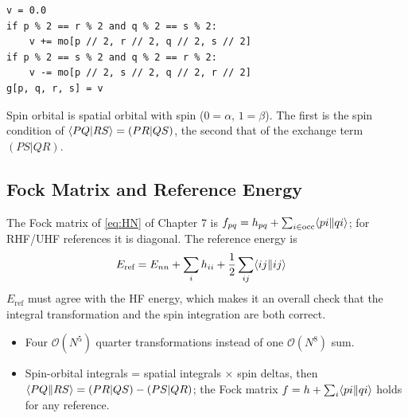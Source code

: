 \begin{codemap}
\begin{lstlisting}[frame=none, numbers=none, xleftmargin=0pt, backgroundcolor={}]
v = 0.0
if p % 2 == r % 2 and q % 2 == s % 2:
    v += mo[p // 2, r // 2, q // 2, s // 2]
if p % 2 == s % 2 and q % 2 == r % 2:
    v -= mo[p // 2, s // 2, q // 2, r // 2]
g[p, q, r, s] = v
\end{lstlisting}
Spin orbital  is spatial orbital  with spin  ($0 = \alpha$, $1 = \beta$). The first  is the spin condition of $\langle PQ\vert RS\rangle = (PR|QS)$, the second that of the exchange term $(PS|QR)$.
\end{codemap}

\subsection{Fock Matrix and Reference Energy}

The Fock matrix of \eqref{eq:HN} of Chapter 7 is $f_{pq} = h_{pq} + \sum_{i \in \text{occ}} \langle pi\Vert qi\rangle$; for RHF/UHF references it is diagonal. The reference energy is
\begin{align*}
E_{\text{ref}} &= E_{nn} + \sum_i h_{ii} + \frac{1}{2} \sum_{ij} \langle ij\Vert ij\rangle
\end{align*}
$E_{\text{ref}}$ must agree with the HF energy, which makes it an overall check that the integral transformation and the spin integration are both correct.

\begin{summary}
\begin{itemize}
\item Four $\mathcal{O}(N^5)$ quarter transformations instead of one $\mathcal{O}(N^8)$ sum.
\item Spin-orbital integrals = spatial integrals × spin deltas, then $\langle PQ\Vert RS\rangle = (PR\vert QS) - (PS\vert QR)$; the Fock matrix $f = h + \sum_i \langle pi\Vert qi\rangle$ holds for any reference.
\end{itemize}
\end{summary}
